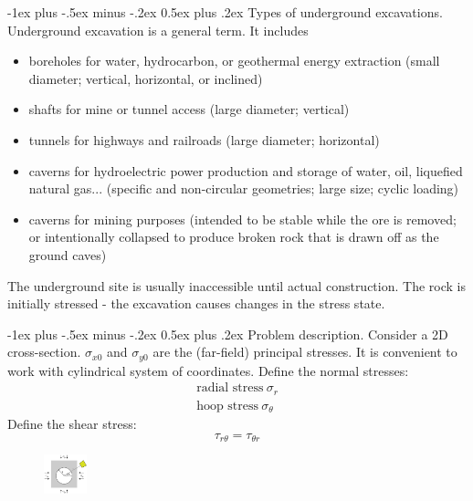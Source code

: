 \documentclass[10pt,landscape,a4paper]{article}
\makeatletter
\renewcommand{\section}{\@startsection{section}{1}{0mm}%
	{-1ex plus -.5ex minus -.2ex}%
	{0.5ex plus .2ex}%
	{\normalfont\large\bfseries}}
\makeatother
\begin{document}
\begin{multicols}{3}
	\section{Types of underground excavations.}
	Underground excavation is a general term.
	It includes
	\begin{itemize}
		\item boreholes for water, hydrocarbon, or geothermal energy extraction (small diameter; vertical, horizontal, or inclined)
		\item shafts for mine or tunnel access (large diameter; vertical)
		\item tunnels for highways and railroads (large diameter; horizontal)
		\item caverns for hydroelectric power production and storage of water, oil, liquefied natural gas... (specific and non-circular geometries; large size; cyclic loading)
		\item caverns for mining purposes (intended to be stable while the ore is removed; or intentionally collapsed to produce broken rock that is drawn off as the ground caves)
	\end{itemize}
	The underground site is usually inaccessible until actual construction.
	The rock is initially stressed - the excavation causes changes in the stress state.
	
	\section{Problem description.}
	Consider a 2D cross-section.
	$\sigma_{x0}$ and $\sigma_{y0}$ are the (far-field) principal stresses.
	It is convenient to work with cylindrical system of coordinates.
	Define the normal stresses:
	\begin{align*}
		\text{radial stress} \ \sigma_r \\
		\text{hoop stress} \ \sigma_\theta
	\end{align*}
	Define the shear stress:
	\[
		\tau_{r\theta}=\tau_{\theta r}
	\]
	\begin{figure}[H]
		\centering
		\includegraphics[width=0.11\textwidth]{kirsch-analytical}
	\end{figure}
	

\end{multicols}
\end{document}

